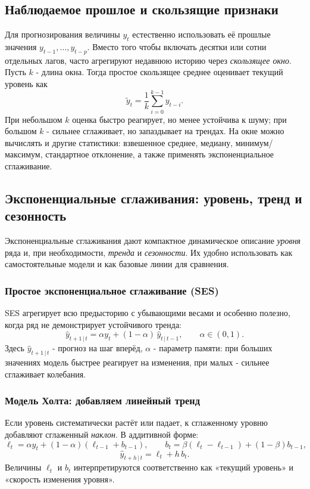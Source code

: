 \documentclass[12pt,a4paper]{article}
\begin{document}
\subsection{Наблюдаемое прошлое и скользящие признаки}

Для прогнозирования величины $y_t$ естественно использовать её прошлые значения $y_{t-1},\dots,y_{t-p}$. Вместо того чтобы включать десятки или сотни отдельных лагов, часто агрегируют недавнюю историю через \emph{скользящее окно}. Пусть $k$ - длина окна. Тогда простое скользящее среднее оценивает текущий уровень как
\[
\tilde y_t=\frac{1}{k}\sum_{i=0}^{k-1} y_{t-i}.
\]
При небольшом $k$ оценка быстро реагирует, но менее устойчива к шуму; при большом $k$ - сильнее сглаживает, но запаздывает на трендах. На окне можно вычислять и другие статистики: взвешенное среднее, медиану, минимум/максимум, стандартное отклонение, а также применять экспоненциальное сглаживание.

\subsection{Экспоненциальные сглаживания: уровень, тренд и сезонность}

Экспоненциальные сглаживания дают компактное динамическое описание \emph{уровня} ряда и, при необходимости, \emph{тренда} и \emph{сезонности}. Их удобно использовать как самостоятельные модели и как базовые линии для сравнения.

\subsubsection{Простое экспоненциальное сглаживание (SES)}
SES агрегирует всю предысторию с убывающими весами и особенно полезно, когда ряд не демонстрирует устойчивого тренда:
\[
\hat y_{t+1\,|\,t}=\alpha y_t+(1-\alpha)\,\hat y_{t\,|\,t-1}, \qquad \alpha\in(0,1).
\]
Здесь $\hat y_{t+1\,|\,t}$ - прогноз на шаг вперёд, $\alpha$ - параметр памяти: при больших значениях модель быстрее реагирует на изменения, при малых - сильнее сглаживает колебания.

\subsubsection{Модель Холта: добавляем линейный тренд}
Если уровень систематически растёт или падает, к сглаженному уровню добавляют сглаженный \emph{наклон}. В аддитивной форме:
\[
\ell_t=\alpha y_t+(1-\alpha)(\ell_{t-1}+b_{t-1}), \qquad
b_t=\beta(\ell_t-\ell_{t-1})+(1-\beta)b_{t-1},
\]
\[
\hat y_{t+h\,|\,t}=\ell_t+h\,b_t.
\]
Величины $\ell_t$ и $b_t$ интерпретируются соответственно как «текущий уровень» и «скорость изменения уровня».
\end{document}
